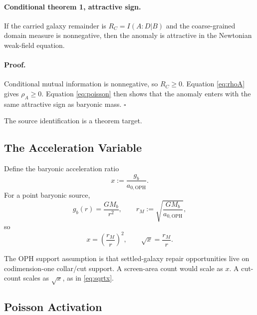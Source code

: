 \documentclass[11pt]{article}
\newcommand{\aoph}{a_{0,\mathrm{OPH}}}
\begin{document}
\paragraph{Conditional theorem 1, attractive sign.}
If the carried galaxy remainder is \(R_C=I(A:D|B)\) and the coarse-grained
domain measure is nonnegative, then the anomaly is attractive in the
Newtonian weak-field equation.

\paragraph{Proof.}
Conditional mutual information is nonnegative, so \(R_C\ge0\).  Equation
\eqref{eq:rhoA} gives \(\rho_A\ge0\).  Equation \eqref{eq:poisson} then shows
that the anomaly enters with the same attractive sign as baryonic mass.
\(\square\)

The source identification is a theorem target.

\subsection{The Acceleration Variable}

Define the baryonic acceleration ratio
\begin{equation}
  x := \frac{g_b}{\aoph}.
\end{equation}
For a point baryonic source,
\begin{equation}
  g_b(r)=\frac{G M_b}{r^2},
  \qquad
  r_M := \sqrt{\frac{G M_b}{\aoph}},
\end{equation}
so
\begin{equation}
  x=\left(\frac{r_M}{r}\right)^2,
  \qquad
  \sqrt{x}=\frac{r_M}{r}.
  \label{eq:sqrtx}
\end{equation}

The OPH support assumption is that settled-galaxy repair opportunities live
on codimension-one collar/cut support.  A screen-area count would scale as
\(x\).  A cut-count scales as \(\sqrt{x}\), as in \eqref{eq:sqrtx}.

\subsection{Poisson Activation}
\end{document}

